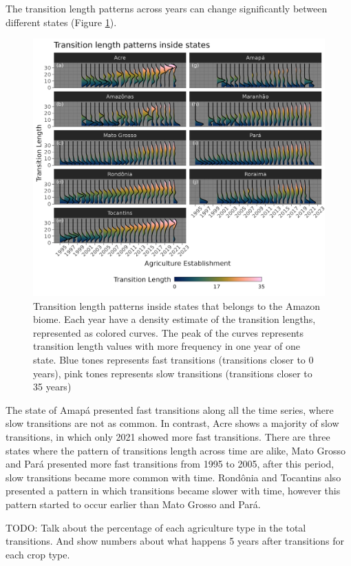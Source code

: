 \documentclass[essd, manuscript]{copernicus}
\begin{document}
The transition length patterns across years can change significantly between different states (Figure \ref{fig:transridge-plot}).

\begin{figure}[ht]
\includegraphics[width=17cm]{figs/trans_ridge} \caption{Transition length patterns inside states that belongs to the Amazon biome. Each year have a density estimate of the transition lengths, represented as colored curves. The peak of the curves represents transition length values with more frequency in one year of one state. Blue tones represents fast transitions (transitions closer to 0 years), pink tones represents slow transitions (transitions closer to 35 years)}\label{fig:transridge-plot}
\end{figure}

The state of Amapá presented fast transitions along all the time series, where slow transitions are not as common.
In contrast, Acre shows a majority of slow transitions, in which only 2021 showed more fast transitions.
There are three states where the pattern of transitions length across time are alike, Mato Grosso and Pará presented more fast transitions from 1995 to 2005, after this period, slow transitions became more common with time.
Rondônia and Tocantins also presented a pattern in which transitions became slower with time, however this pattern started to occur earlier than Mato Grosso and Pará.

TODO: Talk about the percentage of each agriculture type in the total transitions.
And show numbers about what happens 5 years after transitions for each crop type.
\end{document}
